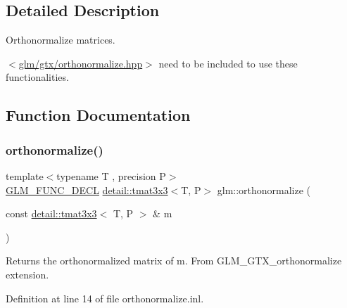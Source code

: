 \subsection{Detailed Description}
Orthonormalize matrices. 

$<$\hyperlink{orthonormalize_8hpp}{glm/gtx/orthonormalize.\+hpp}$>$ need to be included to use these functionalities. 

\subsection{Function Documentation}
\mbox{\label{group__gtx__orthonormalize_ga2d615d8b740d7d11e583651c34103e40}} 
\subsubsection{\texorpdfstring{orthonormalize()}{orthonormalize()}\hspace{0.1cm}{\footnotesize\ttfamily [1/2]}}
{\footnotesize\ttfamily template$<$typename T , precision P$>$ \\
\hyperlink{setup_8hpp_ab2d052de21a70539923e9bcbf6e83a51}{G\+L\+M\+\_\+\+F\+U\+N\+C\+\_\+\+D\+E\+CL} \hyperlink{structglm_1_1detail_1_1tmat3x3}{detail\+::tmat3x3}$<$T, P$>$ glm\+::orthonormalize (\begin{DoxyParamCaption}\item[{const \hyperlink{structglm_1_1detail_1_1tmat3x3}{detail\+::tmat3x3}$<$ T, P $>$ \&}]{m }\end{DoxyParamCaption})}

Returns the orthonormalized matrix of m. From G\+L\+M\+\_\+\+G\+T\+X\+\_\+orthonormalize extension. 

Definition at line 14 of file orthonormalize.\+inl.

\mbox{\label{group__gtx__orthonormalize_ga41d176cb31fda91b672655c839084b43}} 

